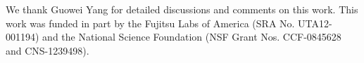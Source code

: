 \documentclass[times,doublespace]{stvrauth}%
\begin{document}

\maketitle
{}










\ack We thank Guowei Yang for detailed discussions and comments on this work. 
This work was funded in part by the Fujitsu Labs of America (SRA No. UTA12-001194) and the National Science Foundation (NSF Grant Nos. CCF-0845628 and CNS-1239498).



\end{document}
